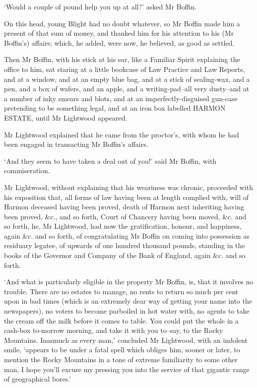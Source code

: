 ‘Would a couple of pound help you up at all?’ asked Mr Boffin.

On this head, young Blight had no doubt whatever, so Mr Boffin made him
a present of that sum of money, and thanked him for his attention to his
(Mr Boffin’s) affairs; which, he added, were now, he believed, as good
as settled.

Then Mr Boffin, with his stick at his ear, like a Familiar Spirit
explaining the office to him, sat staring at a little bookcase of Law
Practice and Law Reports, and at a window, and at an empty blue bag, and
at a stick of sealing-wax, and a pen, and a box of wafers, and an apple,
and a writing-pad--all very dusty--and at a number of inky smears
and blots, and at an imperfectly-disguised gun-case pretending to be
something legal, and at an iron box labelled HARMON ESTATE, until Mr
Lightwood appeared.

Mr Lightwood explained that he came from the proctor’s, with whom he had
been engaged in transacting Mr Boffin’s affairs.

‘And they seem to have taken a deal out of you!’ said Mr Boffin, with
commiseration.

Mr Lightwood, without explaining that his weariness was chronic,
proceeded with his exposition that, all forms of law having been at
length complied with, will of Harmon deceased having been proved, death
of Harmon next inheriting having been proved, \&{c}., and so forth, Court
of Chancery having been moved, \&{c}. and so forth, he, Mr Lightwood, had
now the gratification, honour, and happiness, again \&{c}. and so forth, of
congratulating Mr Boffin on coming into possession as residuary legatee,
of upwards of one hundred thousand pounds, standing in the books of the
Governor and Company of the Bank of England, again \&{c}. and so forth.

‘And what is particularly eligible in the property Mr Boffin, is, that
it involves no trouble. There are no estates to manage, no rents to
return so much per cent upon in bad times (which is an extremely dear
way of getting your name into the newspapers), no voters to become
parboiled in hot water with, no agents to take the cream off the
milk before it comes to table. You could put the whole in a cash-box
to-morrow morning, and take it with you to--say, to the Rocky Mountains.
Inasmuch as every man,’ concluded Mr Lightwood, with an indolent smile,
‘appears to be under a fatal spell which obliges him, sooner or later,
to mention the Rocky Mountains in a tone of extreme familiarity to some
other man, I hope you’ll excuse my pressing you into the service of that
gigantic range of geographical bores.’


